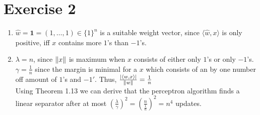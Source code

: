 \documentclass[12pt]{article}
\DeclarePairedDelimiter\abs{\lvert}{\rvert}
\DeclarePairedDelimiter\Abs{\lVert}{\rVert}
\begin{document}
\section*{Exercise 2}
\begin{enumerate}[label=(\alph*)]
	\item	$\hat{w}=\textbf{1}=(1, \dots, 1) \in \{1\}^n$ is a suitable weight vector, since $\langle \hat{w},x \rangle$ is only positive, iff $x$ contains more $1$'s than $-1$'s.
	\item	$\lambda = n$, since $\Abs{x}$ is maximum when $x$ consists of either only $1$'s or only $-1$'s. \\
			$\gamma = \frac{1}{n}$ since the margin is minimal for a $x$ which consists of an by one number off amount of $1$'s and $-1'$. Thus, $\frac{\abs{\langle w,x \rangle}}{\Abs{w}} = \frac{1}{n}$ \\
			Using Theorem 1.13 we can derive that the perceptron algorithm finds a linear separator after at most $\left(\frac{\lambda}{\gamma}\right)^2 = \left( \frac{n}{\frac{1}{n}}\right)^2 = n^4$ updates.
\end{enumerate}
\end{document}
